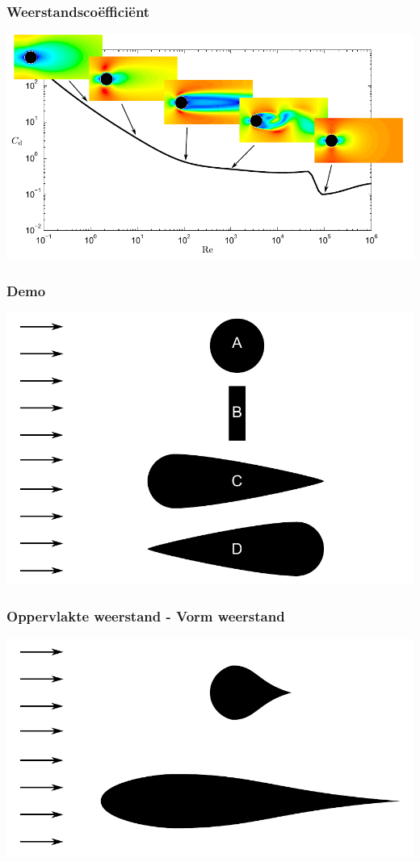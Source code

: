 \documentclass[t]{beamer}
\begin{document}
  	\begin{frame}
  		\frametitle{Weerstandscoëfficiënt}
  		\center
  		\includegraphics[width=\textwidth]{../fig/uitwendige_stroming/Cilinderstroming_Cd_snelheidsvelden}
  	\end{frame}
  	\begin{frame}
		\frametitle{Demo}
		\center
    	\includegraphics[height=0.8\textheight]{../fig/uitwendige_stroming/Invloed_van_vorm_op_weerstand}
  	\end{frame}
  	\begin{frame}
		\frametitle{Oppervlakte weerstand - Vorm weerstand}
		\center
    	\includegraphics[width=\textwidth]{../fig/uitwendige_stroming/Vormweerstand-oppervlakteweerstand}
  	\end{frame}
\end{document}
